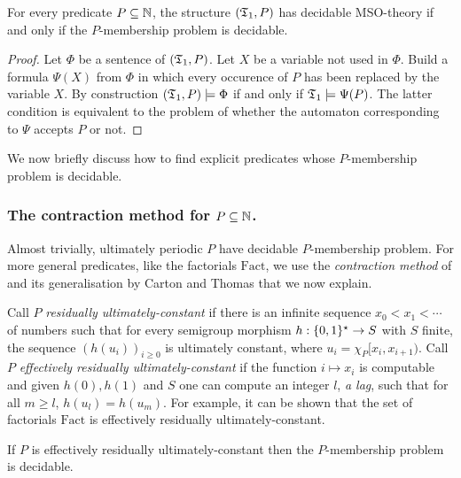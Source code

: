 \begin{lemma} \cite{ElRa66}
For every predicate $P \subseteq \mathbb{N}$, the structure $(\mathfrak{T}_1,P)$ has decidable
MSO-theory if and only if the $P$-membership problem is decidable.
\end{lemma}

\begin{proof}
Let $\Phi$ be a sentence of $(\mathfrak{T}_1,P)$. Let $X$ be a
variable not used in $\Phi$.  Build a formula $\Psi(X)$ from $\Phi$ in which
every occurence of $P$ has been replaced by the variable $X$.  By construction
$(\mathfrak{T}_1,P) \models \Phi$ if and only if $\mathfrak{T}_1 \models \Psi(P)$.  The
latter condition is equivalent to the problem of whether the automaton
corresponding to $\Psi$ accepts $P$ or not.
\end{proof}

We now briefly discuss how to find explicit predicates whose $P$-membership problem is decidable.

\subsubsection*{The contraction method for $P \subseteq \mathbb{N}$.}
Almost trivially, ultimately periodic $P$ have decidable $P$-membership problem.
For more general predicates, like the factorials $\mathrm{Fact}$, we use the {\em contraction method} of \cite{ElRa66}
and its generalisation by Carton and Thomas \cite{CaTh02} that we now explain.

Call $P$  {\em residually ultimately-constant} if there is an infinite sequence $x_0 < x_1 < \cdots$ of numbers such that
for every semigroup morphism $h:\{0,1\}^\star \to S$ with $S$ finite, the sequence $(h(u_i))_{i \geq 0}$ is ultimately constant,
where $u_i = \chi_P[x_i,x_{i+1})$.
Call $P$ {\em effectively residually ultimately-constant} if the function $i \mapsto x_i$ is computable and given $h(0),h(1)$ and $S$ one can compute an integer $l$, {\em a lag}, such that for all $m \geq l$, $h(u_l) = h(u_m)$. For example, it can be shown that the set of factorials $\textrm{Fact}$ is effectively residually ultimately-constant.

\begin{proposition} \cite{CaTh02}
If $P$ is effectively residually ultimately-constant then the $P$-membership problem is decidable.
\end{proposition}


